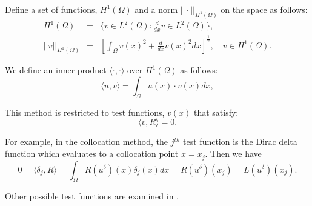 Define a set of functions, $H^1(\Omega)$  and a norm
$||\cdot||_{H^1(\Omega)}$ on the space as follows:
\begin{eqnarray}
H^1(\Omega) &=& \{v \in L^2(\Omega) : \frac{d}{dx}v \in L^2(\Omega)\}, \\
||v ||_{H^1(\Omega)} &=& \left[ \int_{\Omega}v(x)^2 + \frac{d}{dx}v(x)^2 dx \right]^{\frac{1}{2}}, \quad v \in H^1(\Omega).
\end{eqnarray}

We define an inner-product $\langle \cdot, \cdot \rangle$ over
$H^1(\Omega)$  as follows:
\begin{equation}
\label{functional}
\langle u, v \rangle = \int_{\Omega} u(x) \cdot v(x) dx,
\end{equation}

This method is restricted to test functions, $v(x)$ that satisfy:
\begin{equation}
\langle v, R \rangle = 0.
\end{equation}

For example, in the collocation method, the $j^{th}$ test function
is the Dirac delta function which evaluates to a collocation point
$x = x_j$. Then we have
\begin{equation}
0 = \langle \delta_j, R \rangle = \int_{\Omega} R(u^{\delta})(x)\delta_j(x)dx = R(u^{\delta})(x_j) = L(u^{\delta})(x_j).
\end{equation}

Other possible test functions are examined in \cite{Karniadarkis}.
